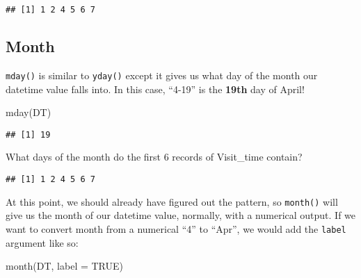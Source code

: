 \documentclass[
]{book}
\newenvironment{Shaded}{\begin{snugshade}}{\end{snugshade}}
\newcommand{\AttributeTok}[1]{\textcolor[rgb]{0.77,0.63,0.00}{#1}}
\newcommand{\ConstantTok}[1]{\textcolor[rgb]{0.00,0.00,0.00}{#1}}
\newcommand{\FunctionTok}[1]{\textcolor[rgb]{0.00,0.00,0.00}{#1}}
\newcommand{\NormalTok}[1]{#1}
\newcommand{\SpecialCharTok}[1]{\textcolor[rgb]{0.00,0.00,0.00}{#1}}
\begin{document}
\begin{Shaded}
\end{Shaded}

\begin{verbatim}
## [1] 1 2 4 5 6 7
\end{verbatim}

\hypertarget{month}{%
\subsection{Month}\label{month}}

\texttt{mday()} is similar to \texttt{yday()} except it gives us what day of the month our datetime value falls into. In this case, ``4-19'' is the \textbf{19th} day of April!

\begin{Shaded}
\begin{Highlighting}[]
\FunctionTok{mday}\NormalTok{(DT)}
\end{Highlighting}
\end{Shaded}

\begin{verbatim}
## [1] 19
\end{verbatim}

What days of the month do the first 6 records of Visit\_time contain?

\begin{Shaded}
\end{Shaded}

\begin{verbatim}
## [1] 1 2 4 5 6 7
\end{verbatim}

At this point, we should already have figured out the pattern, so \texttt{month()} will give us the month of our datetime value, normally, with a numerical output. If we want to convert month from a numerical ``4'' to ``Apr'', we would add the \texttt{label} argument like so:

\begin{Shaded}
\begin{Highlighting}[]
\FunctionTok{month}\NormalTok{(DT, }\AttributeTok{label =} \ConstantTok{TRUE}\NormalTok{)}
\end{Highlighting}
\end{Shaded}
\end{document}
